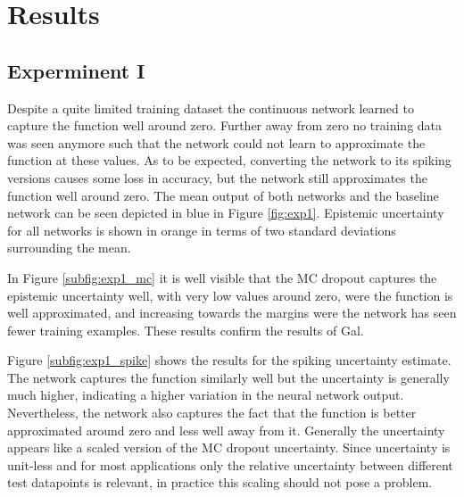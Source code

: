 \documentclass[10pt,a4paper,twocolumn]{article}
\begin{document}
\section{Results}


\subsection{Experminent I}

Despite a quite limited training dataset the continuous network learned to capture the function well around zero. Further away from zero no training data was seen anymore such that the network could not learn to approximate the function at these values. As to be expected, converting the network to its spiking versions causes some loss in accuracy, but the network still approximates the function well around zero. The mean output of both networks and the baseline network can be seen depicted in blue in Figure \ref{fig:exp1}. Epistemic uncertainty for all networks is shown in orange in terms of two standard deviations surrounding the mean. 

In Figure \ref{subfig:exp1_mc} it is well visible that the MC dropout captures the epistemic uncertainty well, with very low values around zero, were the function is well approximated, and increasing towards the margins were the network has seen fewer training examples. These results confirm the results of Gal. 

Figure \ref{subfig:exp1_spike} shows the results for the spiking uncertainty estimate. The network captures the function similarly well but the uncertainty is generally much higher, indicating a higher variation in the neural network output. Nevertheless, the network also captures the fact that the function is better approximated around zero and less well away from it. Generally the uncertainty appears like a scaled version of the MC dropout uncertainty. Since uncertainty is unit-less and for most applications only the relative uncertainty between different test datapoints is relevant, in practice this scaling should not pose a problem. 
\end{document}
